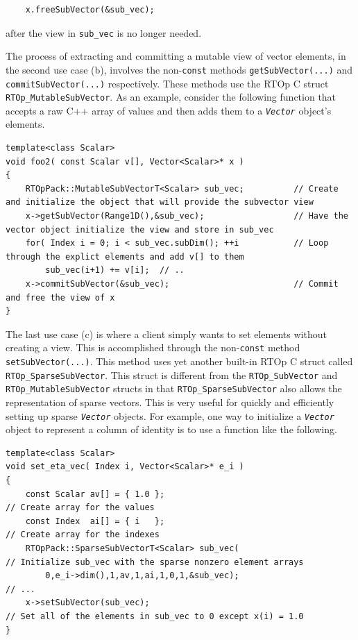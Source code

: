\documentclass[10pt,fleqn]{article}
\begin{document}
{\scriptsize\begin{verbatim}
    x.freeSubVector(&sub_vec);
\end{verbatim}}

after the view in \texttt{sub\_vec} is no longer needed.

The process of extracting and committing a mutable view of
vector elements, in the second use case (b), involves the non-\texttt{const}
methods \texttt{getSubVector(...)} and
\texttt{commitSubVector(...)} respectively.  These methods use the
RTOp C struct \texttt{RTOp\_MutableSubVector}.  As an example, consider the
following function that accepts a raw C++ array of values and then adds them
to a \texttt{\textit{Vector}} object's elements.

{\scriptsize\begin{verbatim}
template<class Scalar>
void foo2( const Scalar v[], Vector<Scalar>* x )
{
    RTOpPack::MutableSubVectorT<Scalar> sub_vec;          // Create and initialize the object that will provide the subvector view
    x->getSubVector(Range1D(),&sub_vec);                  // Have the vector object initialize the view and store in sub_vec
    for( Index i = 0; i < sub_vec.subDim(); ++i           // Loop through the explict elements and add v[] to them
        sub_vec(i+1) += v[i];  // ..
    x->commitSubVector(&sub_vec);                         // Commit and free the view of x
}
\end{verbatim}}

The last use case (c) is where a client simply wants to set elements
without creating a view.  This is accomplished through the
non-\texttt{const} method \texttt{setSubVector(...)}.  This method
uses yet another built-in RTOp C struct called
\texttt{RTOp\_SparseSubVector}.  This struct is different from the
\texttt{RTOp\_SubVector} and
\texttt{RTOp\_MutableSubVector} structs in that
\texttt{RTOp\_SparseSubVector} also allows the representation of 
sparse vectors.  This is very useful for quickly and efficiently
setting up sparse \texttt{\textit{Vector}} objects.  For example, one
way to initialize a \texttt{\textit{Vector}} object to represent a
column of identity is to use a function like the following.

{\scriptsize\begin{verbatim}
template<class Scalar>
void set_eta_vec( Index i, Vector<Scalar>* e_i )
{
    const Scalar av[] = { 1.0 };                                        // Create array for the values
    const Index  ai[] = { i   };                                        // Create array for the indexes
    RTOpPack::SparseSubVectorT<Scalar> sub_vec(                         // Initialize sub_vec with the sparse nonzero element arrays
        0,e_i->dim(),1,av,1,ai,1,0,1,&sub_vec);                         // ...
    x->setSubVector(sub_vec);                                           // Set all of the elements in sub_vec to 0 except x(i) = 1.0
}
\end{verbatim}}
\end{document}
